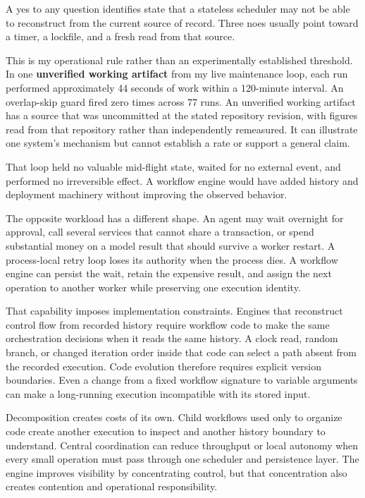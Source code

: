 A yes to any question identifies state that a stateless scheduler may not be able to reconstruct from the current source of record. Three noes usually point toward a timer, a lockfile, and a fresh read from that source.

This is my operational rule rather than an experimentally established threshold. In one \textbf{unverified working artifact} from my live maintenance loop, each run performed approximately 44 seconds of work within a 120-minute interval. An overlap-skip guard fired zero times across 77 runs. An unverified working artifact has a source that was uncommitted at the stated repository revision, with figures read from that repository rather than independently remeasured. It can illustrate one system's mechanism but cannot establish a rate or support a general claim.

That loop held no valuable mid-flight state, waited for no external event, and performed no irreversible effect. A workflow engine would have added history and deployment machinery without improving the observed behavior.

The opposite workload has a different shape. An agent may wait overnight for approval, call several services that cannot share a transaction, or spend substantial money on a model result that should survive a worker restart. A process-local retry loop loses its authority when the process dies. A workflow engine can persist the wait, retain the expensive result, and assign the next operation to another worker while preserving one execution identity.

That capability imposes implementation constraints. Engines that reconstruct control flow from recorded history require workflow code to make the same orchestration decisions when it reads the same history. A clock read, random branch, or changed iteration order inside that code can select a path absent from the recorded execution. Code evolution therefore requires explicit version boundaries. Even a change from a fixed workflow signature to variable arguments can make a long-running execution incompatible with its stored input.

Decomposition creates costs of its own. Child workflows used only to organize code create another execution to inspect and another history boundary to understand. Central coordination can reduce throughput or local autonomy when every small operation must pass through one scheduler and persistence layer. The engine improves visibility by concentrating control, but that concentration also creates contention and operational responsibility.

